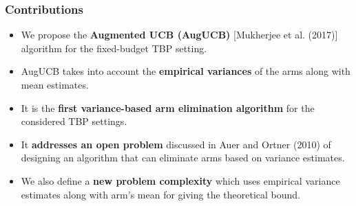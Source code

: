 \begin{frame}
\frametitle{Contributions}
\begin{itemize}
\item<1-> We propose the \textbf{Augmented UCB (AugUCB)} [{Mukherjee et al. (2017)}]  algorithm for the fixed-budget TBP setting.
\item<2-> AugUCB takes into account the \textbf{empirical variances} of the arms along with mean estimates.
\item<3-> It is the \textbf{first variance-based arm elimination algorithm} for the considered TBP settings. 
\item<4-> It \textbf{addresses an open problem} discussed in {Auer and Ortner (2010)} of designing an algorithm that can eliminate arms based on variance estimates.
\item<5-> We also define a \textbf{new problem complexity} which uses empirical variance estimates along with arm's mean for giving the theoretical bound.
\end{itemize}
\end{frame}


%


